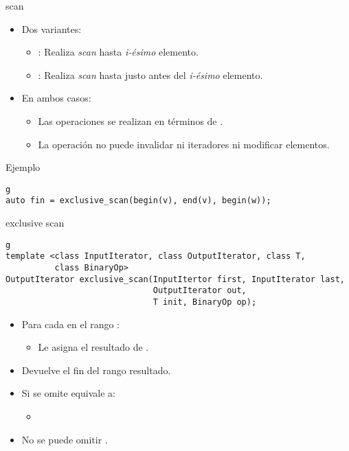 \begin{frame}[t,fragile]{scan}
\begin{itemize}
  \item Dos variantes:
    \begin{itemize}
      \item {}: Realiza \emph{scan} hasta \emph{i-ésimo} elemento.
      \item {}: Realiza \emph{scan} hasta justo antes del \emph{i-ésimo} elemento.
    \end{itemize}
  \item En ambos casos:
    \begin{itemize}
      \item Las operaciones se realizan en términos de .
      \item La operación no puede invalidar ni iteradores ni modificar elementos.
    \end{itemize}
\end{itemize}
\begin{block}{Ejemplo}
\begin{lstlisting}g
auto fin = exclusive_scan(begin(v), end(v), begin(w));
\end{lstlisting}
\end{block}
\end{frame}

\begin{frame}[t,fragile]{exclusive scan}
\begin{lstlisting}g
template <class InputIterator, class OutputIterator, class T, 
          class BinaryOp>
OutputIterator exclusive_scan(InputItertor first, InputIterator last, 
                              OutputIterator out,
                              T init, BinaryOp op);
\end{lstlisting}
\begin{itemize}
  \item Para cada  en el rango \cppid{[out, out + (last-first))}:
    \begin{itemize}
      \item Le asigna el resultado de 
        .
    \end{itemize}
  \item Devuelve el fin del rango resultado.
  \vfill
  \item Si se omite  equivale a:
    \begin{itemize}
      \item {}
    \end{itemize}
  \item No se puede omitir .
\end{itemize}
\end{frame}

